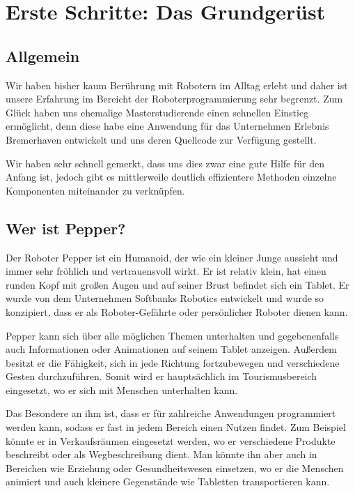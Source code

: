 \newcommand{\chaptergrundgeruest}{Kapitel 3. }

\chapter{Erste Schritte: Das Grundgerüst}
\label{sec:erste-schritte-und-installation}
\lhead{\chaptergrundgeruest \emph{Erste Schritte: Das Grundgerüst}}

\section{Allgemein}
Wir haben bisher kaum Berührung mit Robotern im Alltag erlebt und daher ist unsere Erfahrung im Bereicht
der Roboterprogrammierung sehr begrenzt. Zum Glück haben uns ehemalige Masterstudierende einen schnellen
Einstieg ermöglicht, denn diese habe eine Anwendung für das Unternehmen \grqq{}Erlebnis Bremerhaven\grqq{}
entwickelt und uns deren Quellcode zur Verfügung gestellt.

Wir haben sehr schnell gemerkt, dass uns dies zwar eine gute Hilfe für den Anfang ist, jedoch gibt es mittlerweile
deutlich effizientere Methoden einzelne Komponenten miteinander zu verknüpfen.\\

\section{Wer ist Pepper?}

Der Roboter Pepper ist ein Humanoid, der wie ein kleiner Junge aussieht und immer sehr fröhlich und vertrauensvoll wirkt. Er ist relativ klein, hat einen runden Kopf mit großen Augen und auf seiner Brust befindet sich ein Tablet. Er wurde von dem Unternehmen Softbanks Robotics entwickelt und wurde so konzipiert, dass er als Roboter-Gefährte oder persönlicher Roboter dienen kann.

Pepper kann sich über alle möglichen Themen unterhalten und gegebenenfalls auch Informationen oder Animationen auf seinem Tablet anzeigen. Außerdem besitzt er die Fähigkeit, sich in jede Richtung fortzubewegen und verschiedene Gesten durchzuführen. Somit wird er hauptsächlich im Tourismusbereich eingesetzt, wo er sich mit Menschen unterhalten kann.

Das Besondere an ihm ist, dass er für zahlreiche Anwendungen programmiert werden kann, sodass er fast in jedem Bereich einen Nutzen findet. Zum Beispiel könnte er in Verkaufsräumen eingesetzt werden, wo er verschiedene Produkte beschreibt oder als Wegbeschreibung dient. Man könnte ihn aber auch in Bereichen wie Erziehung oder Gesundheitswesen einsetzen, wo er die Menschen animiert und auch kleinere Gegenstände wie Tabletten transportieren kann.

